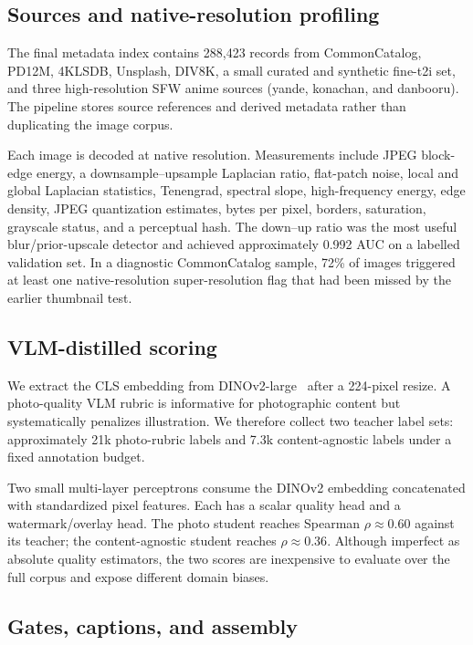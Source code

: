 \documentclass[10pt]{article}
\begin{document}
\subsection{Sources and native-resolution profiling}

The final metadata index contains 288,423 records from CommonCatalog, PD12M,
4KLSDB, Unsplash, DIV8K, a small curated and synthetic fine-t2i set, and three
high-resolution SFW anime sources (yande, konachan, and danbooru). The pipeline
stores source references and derived metadata rather than duplicating the
image corpus.

Each image is decoded at native resolution. Measurements include JPEG
block-edge energy, a downsample--upsample Laplacian ratio, flat-patch noise,
local and global Laplacian statistics, Tenengrad, spectral slope,
high-frequency energy, edge density, JPEG quantization estimates, bytes per
pixel, borders, saturation, grayscale status, and a perceptual hash. The
down--up ratio was the most useful blur/prior-upscale detector and achieved
approximately 0.992 AUC on a labelled validation set. In a diagnostic CommonCatalog sample, 72\% of images triggered at least one native-resolution super-resolution flag that had been missed by the earlier thumbnail test.

\subsection{VLM-distilled scoring}

We extract the CLS embedding from DINOv2-large~\cite{oquab2024dinov2} after a
224-pixel resize. A photo-quality VLM rubric is informative for photographic
content but systematically penalizes illustration. We therefore collect two
teacher label sets: approximately 21k photo-rubric labels and 7.3k
content-agnostic labels under a fixed annotation budget.

Two small multi-layer perceptrons consume the DINOv2 embedding concatenated with standardized pixel features. Each has a scalar quality head and a watermark/overlay head. The photo student reaches Spearman $\rho\approx0.60$ against its teacher; the content-agnostic student reaches $\rho\approx0.36$. Although imperfect as absolute quality estimators, the two scores are inexpensive to evaluate over the full corpus and expose different domain biases.

\subsection{Gates, captions, and assembly}
\end{document}
